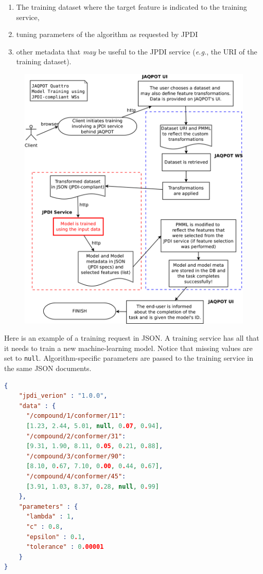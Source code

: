 \begin{enumerate}
 \item The training dataset where the target feature is 
 indicated to the training service, 
 \item tuning parameters of the algorithm as requested by JPDI
 \item other metadata that \textit{may} be useful to the JPDI service
 (\textit{e.g.}, the URI of the training dataset).
\end{enumerate}
\begin{figure}
\centering
\includegraphics[keepaspectratio=true,width=0.999\textwidth]{figures/JPDI_training.eps}
\end{figure}
Here is an example of a training request in JSON. 
A training service has all that it needs to train a
new machine-learning model. Notice that missing values are set
to \texttt{null}.
Algorithm-specific parameters are passed to the training service
in the same JSON documents.

\begin{lstlisting}[language=json]
 {
    "jpdi_verion" : "1.0.0",
    "data" : {
      "/compound/1/conformer/11": 
	  [1.23, 2.44, 5.01, null, 0.07, 0.94],
      "/compound/2/conformer/31": 
	  [9.31, 1.90, 8.11, 0.05, 0.21, 0.88],
      "/compound/3/conformer/90": 
	  [8.10, 0.67, 7.10, 0.00, 0.44, 0.67],
      "/compound/4/conformer/45": 
	  [3.91, 1.03, 8.37, 0.28, null, 0.99]
    },
    "parameters" : {
      "lambda" : 1,
      "c" : 0.8,
      "epsilon" : 0.1,
      "tolerance" : 0.00001
    }
}
\end{lstlisting}

